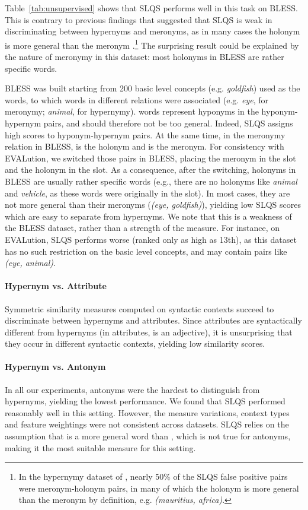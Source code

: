 \documentclass[11pt]{article}
\begin{document}
Table~\ref{tab:unsupervised} shows that SLQS performs well in this task on BLESS. This is contrary to previous findings that suggested that SLQS is weak in discriminating between hypernyms and meronyms, as in many cases the holonym is more general than the meronym \cite{shwartz2016improving}.\footnote{In the hypernymy dataset of , nearly 50\% of the SLQS false positive pairs were meronym-holonym pairs, in many of which the holonym is more general than the meronym by definition, e.g. \emph{(mauritius, africa)}.
} The surprising result could be explained by the nature of meronymy in this dataset: most holonyms in BLESS are rather specific words. 

BLESS was built starting from 200 basic level concepts (e.g. \emph{goldfish}) used as the  words, to which  words in different relations were associated (e.g. \emph{eye}, for meronymy; \emph{animal}, for hypernymy).  words represent hyponyms in the hyponym-hypernym pairs, and should therefore not be too general. Indeed, SLQS assigns high scores to hyponym-hypernym pairs. At the same time, in the meronymy relation in BLESS,  is the holonym and  is the meronym. For consistency with EVALution, we switched those pairs in BLESS, placing the meronym in the  slot and the holonym in the  slot. As a consequence, after the switching, holonyms in BLESS are usually rather specific words (e.g., there are no holonyms like \emph{animal} and \emph{vehicle}, as these words were originally in the  slot). In most cases, they are not more general than their meronyms (\emph{(eye, goldfish)}), yielding low SLQS scores which are easy to separate from hypernyms. We note that this is a weakness of the BLESS dataset, rather than a strength of the measure. For instance, on EVALution, SLQS performs worse (ranked only as high as 13th), as this dataset has no such restriction on the basic level concepts, and may contain pairs like \emph{(eye, animal)}.

\paragraph{Hypernym vs. Attribute} Symmetric similarity measures computed on syntactic contexts succeed to discriminate between hypernyms and attributes. Since attributes are syntactically different from hypernyms (in attributes,  is an adjective), it is unsurprising that they occur in different syntactic contexts, yielding low similarity scores.

\paragraph{Hypernym vs. Antonym} In all our experiments, antonyms were the hardest to distinguish from hypernyms, yielding the lowest performance. We found that SLQS performed reasonably well in this setting. However, the measure variations, context types and feature weightings were not consistent across datasets. SLQS relies on the assumption that  is a more general word than , which is not true for antonyms, making it the most suitable measure for this setting.
\end{document}
